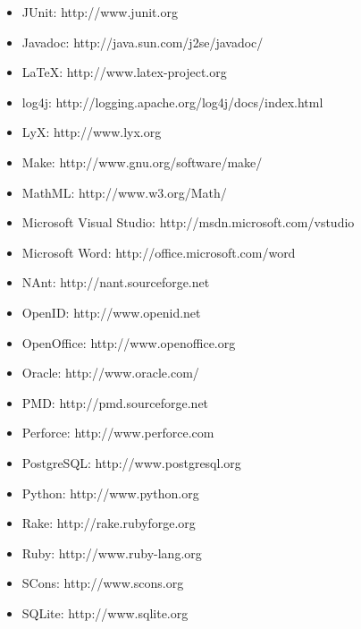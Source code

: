 \documentclass{report}
\begin{document}
\begin{itemize}
  \item JUnit: http://www.junit.org

  \item Javadoc: http://java.sun.com/j2se/javadoc/

  \item LaTeX: http://www.latex-project.org

  \item log4j: http://logging.apache.org/log4j/docs/index.html

  \item LyX: http://www.lyx.org

  \item Make: http://www.gnu.org/software/make/

  \item MathML: http://www.w3.org/Math/

  \item Microsoft Visual Studio: http://msdn.microsoft.com/vstudio

  \item Microsoft Word: http://office.microsoft.com/word

  \item NAnt: http://nant.sourceforge.net

  \item OpenID: http://www.openid.net

  \item OpenOffice: http://www.openoffice.org

  \item Oracle: http://www.oracle.com/

  \item PMD: http://pmd.sourceforge.net

  \item Perforce: http://www.perforce.com

  \item PostgreSQL: http://www.postgresql.org

  \item Python: http://www.python.org

  \item Rake: http://rake.rubyforge.org

  \item Ruby: http://www.ruby-lang.org

  \item SCons: http://www.scons.org

  \item SQLite: http://www.sqlite.org


\end{itemize}
\end{document}
